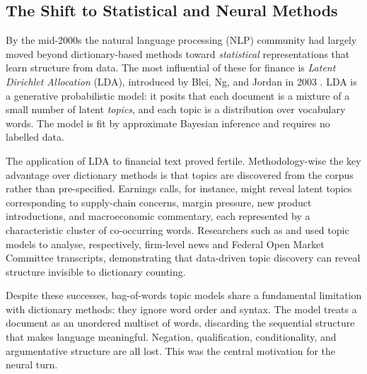 \begin{context}
\subsection{The Shift to Statistical and Neural Methods}
\label{sec:history-shift}

By the mid-2000s the natural language processing (NLP) community had largely moved beyond
dictionary-based methods toward \emph{statistical} representations that learn structure
from data.  The most influential of these for finance is \emph{Latent Dirichlet
Allocation} (LDA), introduced by Blei, Ng, and Jordan in 2003
\cite{blei2003latent}. %
LDA is a generative probabilistic model: it posits that each document is a mixture of a
small number of latent \emph{topics}, and each topic is a distribution over vocabulary
words.  The model is fit by approximate Bayesian inference and requires no labelled data.

The application of LDA to financial text proved fertile.  Methodology-wise the key
advantage over dictionary methods is that topics are discovered from the corpus rather
than pre-specified.  Earnings calls, for instance, might reveal latent topics
corresponding to supply-chain concerns, margin pressure, new product introductions, and
macroeconomic commentary, each represented by a characteristic cluster of co-occurring
words.  Researchers such as \citet{boudoukh2013news} %
and \citet{hansen2018transparency} %
used topic models to analyse, respectively, firm-level news and Federal Open Market
Committee transcripts, demonstrating that data-driven topic discovery can reveal
structure invisible to dictionary counting.

Despite these successes, bag-of-words topic models share a fundamental limitation with
dictionary methods: they ignore word order and syntax.  The model treats a document as
an unordered multiset of words, discarding the sequential structure that makes language
meaningful.  Negation, qualification, conditionality, and argumentative structure are
all lost.  This was the central motivation for the neural turn.


\end{context}
